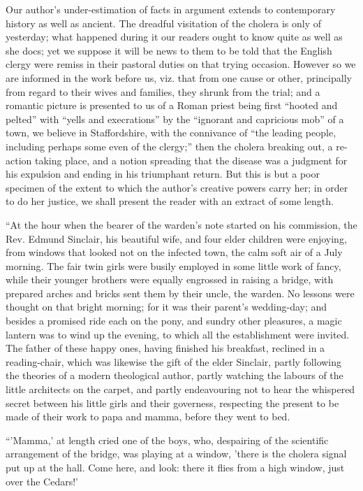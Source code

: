 Our author's under-estimation of facts in argument
extends to contemporary history as well as ancient. The dreadful
visitation of the cholera is only of yesterday; what happened during it
our readers ought to know quite as well as she docs; yet we suppose it
will be news to them to be told that the English clergy were remiss in
their pastoral duties on that trying occasion. However so we are
informed in the work before us, viz. that from one cause or other,
principally from regard to their wives and families, they shrunk from
the trial; and a romantic picture is presented to us of a Roman priest
being first ``hooted and pelted'' with ``yells and execrations'' by the ``ignorant
and capricious mob'' of a town, we believe in Staffordshire, with the
connivance of ``the leading people, including perhaps some even of the
clergy;'' then the cholera breaking out, a re-action taking place, and a
notion spreading that the disease was a judgment for his expulsion and
ending in his triumphant return. But this is but a poor specimen of the
extent to which the author's creative powers carry her; in order to do
her justice, we shall present the reader with an extract of some length.

``At the hour when the bearer of the
warden's note started on his commission, the Rev. Edmund Sinclair, his
beautiful wife, and four elder children were enjoying, from windows that
looked not on the infected town, the calm
soft air of a July morning. The fair twin girls were busily employed in
some little work of fancy, while their younger brothers were equally
engrossed in raising a bridge, with prepared arches and bricks sent them
by their uncle, the warden. No lessons were thought on that bright
morning; for it was their parent's wedding-day; and besides a promised
ride each on the pony, and sundry other pleasures, a magic lantern was
to wind up the evening, to which all the establishment were invited. The
father of these happy ones, having finished his breakfast, reclined in a
reading-chair, which was likewise the gift of the elder Sinclair, partly
following the theories of a modern theological author, partly watching
the labours of the little architects on the carpet, and partly
endeavouring not to hear the whispered secret between his little girls
and their governess, respecting the present to be made of their work to
papa and mamma, before they went to bed.

``'Mamma,' at length cried one of the
boys, who, despairing of the scientific arrangement of the bridge, was
playing at a window, 'there is the cholera signal put up at the hall.
Come here, and look: there it flies from a high window, just over the
Cedars!'

